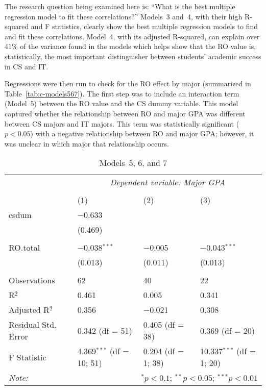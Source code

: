 The research question being examined here is: ``What is the best multiple regression model to fit these correlations?'' Models~3 and~4, with their high R-squared and F statistics, clearly show the best multiple regression models to find and fit these correlations. Model~4, with its adjusted R-squared, can explain over 41\% of the variance found in the models which helps show that the RO value is, statistically, the most important distinguisher between students' academic success in CS and IT.

Regressions were then run to check for the RO effect by major (summarized in Table~\ref{tab:c-models567}). The first step was to include an interaction term (Model~5) between the RO value and the CS dummy variable. This model captured whether the relationship between RO and major GPA was different between CS majors and IT majors. This term was statistically significant ($p<0.05$) with a negative relationship between RO and major GPA; however, it was unclear in which major that relationship occurs.

\begin{table}[!htbp] \centering
  \caption{Models~5, 6, and 7}
  \label{tab:models567}
  \begin{tabular}{@{\extracolsep{5pt}}llll}
    \toprule
     & \multicolumn{3}{c}{\textit{Dependent variable: Major GPA}} \\
    \cmidrule{2-4}
    \\[-1.8ex] & (1) & (2) & (3)\\
    \midrule
    csdum & $-$0.633 &  &  \\
      & (0.469) &  &  \\
      & & & \\
    RO.total & $-$0.038$^{***}$ & $-$0.005 & $-$0.043$^{***}$ \\
      & (0.013) & (0.011) & (0.013) \\
      & & & \\
    \midrule
    Observations & 62 & 40 & 22 \\
    R$^{2}$ & 0.461 & 0.005 & 0.341 \\
    Adjusted R$^{2}$ & 0.356 & $-$0.021 & 0.308 \\
    Residual Std. Error & 0.342 (df = 51) & 0.405 (df = 38) & 0.369 (df = 20) \\
    F Statistic & 4.369$^{***}$ (df = 10; 51) & 0.204 (df = 1; 38) & 10.337$^{***}$ (df = 1; 20) \\
    \bottomrule
    \textit{Note:}  & \multicolumn{3}{r}{$^{*}p<0.1$; $^{**}p<0.05$; $^{***}p<0.01$} \\
  \end{tabular}
\end{table}

